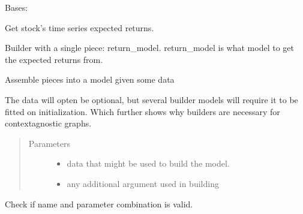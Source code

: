 \documentclass[letterpaper,10pt,english]{sphinxmanual}
\begin{document}
\begin{fulllineitems}
\label{\detokenize{dalio.pipe:dalio.pipe.builders.ExpectedReturns}}
Bases: {\hyperref[\detokenize{dalio.pipe:dalio.pipe.pipe.PipeBuilder}]{}}

Get stock’s time series expected returns.

Builder with a single piece: return\_model. return\_model is what model to
get the expected returns from.

\begin{fulllineitems}
\label{\detokenize{dalio.pipe:dalio.pipe.builders.ExpectedReturns.build_model}}
Assemble pieces into a model given some data

The data will opten be optional, but several builder models will
require it to be fitted on initialization. Which further shows why
builders are necessary for context\sphinxhyphen{}agnostic graphs.
\begin{quote}\begin{description}
\item[{Parameters}] \leavevmode\begin{itemize}
\item {} 
 \textendash{} data that might be used to build the model.

\item {} 
 \textendash{} any additional argument used in building

\end{itemize}

\end{description}\end{quote}

\end{fulllineitems}


\begin{fulllineitems}
\label{\detokenize{dalio.pipe:dalio.pipe.builders.ExpectedReturns.check_name}}
Check if name and parameter combination is valid.


\end{fulllineitems}
\end{fulllineitems}
\end{document}
